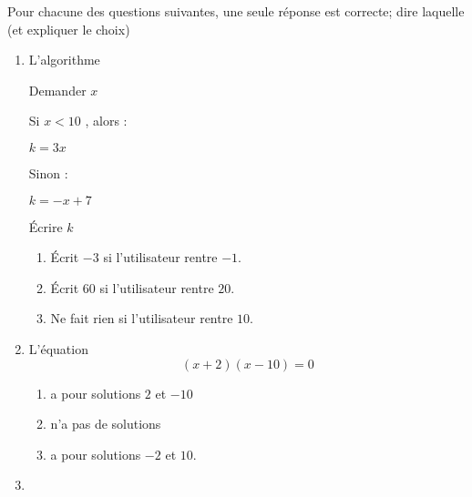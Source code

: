 
\begin{exercice}[\ldots/4]\label{exosmath-0630}

    Pour chacune des questions suivantes, une seule réponse est correcte; dire laquelle (et expliquer le choix)
    \begin{multicols}{2}
    \begin{enumerate}
        \item
           L'algorithme

    \begin{fmpage}{0.9\linewidth}

        Demander \( x\)

    Si  \( x< 10\) , alors :

    \hspace{0.5cm} \( k=3x\)

    Sinon :

    \hspace{0.5cm} \( k=-x+7\)

    Écrire \( k\) 

\end{fmpage}

    \begin{enumerate}
        \item
            Écrit \( -3\) si l'utilisateur rentre \( -1\).
        \item
            Écrit \( 60 \) si l'utilisateur rentre \( 20\).
        \item
            Ne fait rien si l'utilisateur rentre \( 10\).
    \end{enumerate}
    
\item

    L'équation
    \begin{equation*}
        (x+2)(x-10)=0
    \end{equation*}
    \begin{enumerate}
        \item
            a pour solutions \( 2\) et \( -10\)
        \item
            n'a pas de solutions
        \item
            a pour solutions \( -2\) et \( 10\).
    \end{enumerate}
    
\item


\end{enumerate}
\end{multicols}
\end{exercice}
